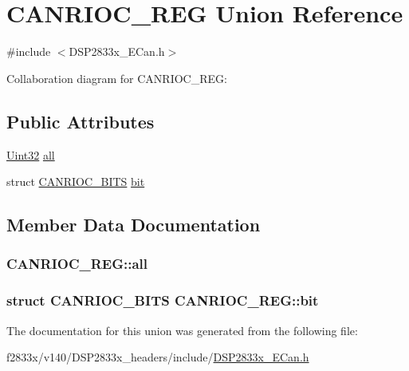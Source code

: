 \hypertarget{union_c_a_n_r_i_o_c___r_e_g}{}\section{C\+A\+N\+R\+I\+O\+C\+\_\+\+R\+E\+G Union Reference}
\label{union_c_a_n_r_i_o_c___r_e_g}


{\ttfamily \#include $<$D\+S\+P2833x\+\_\+\+E\+Can.\+h$>$}



Collaboration diagram for C\+A\+N\+R\+I\+O\+C\+\_\+\+R\+E\+G\+:
\subsection*{Public Attributes}
\begin{DoxyCompactItemize}
\item 
\hyperlink{_d_s_p2833x___device_8h_aba99025e657f892beb7ff31cecf64653}{Uint32} \hyperlink{union_c_a_n_r_i_o_c___r_e_g_ac753aaab9d05739b9a203256e16b3b24}{all}
\item 
struct \hyperlink{struct_c_a_n_r_i_o_c___b_i_t_s}{C\+A\+N\+R\+I\+O\+C\+\_\+\+B\+I\+T\+S} \hyperlink{union_c_a_n_r_i_o_c___r_e_g_a918ebe0c63db3409c4c8c4dceb9e3226}{bit}
\end{DoxyCompactItemize}


\subsection{Member Data Documentation}
\hypertarget{union_c_a_n_r_i_o_c___r_e_g_ac753aaab9d05739b9a203256e16b3b24}{}
\subsubsection[{all}]{ C\+A\+N\+R\+I\+O\+C\+\_\+\+R\+E\+G\+::all}\label{union_c_a_n_r_i_o_c___r_e_g_ac753aaab9d05739b9a203256e16b3b24}
\hypertarget{union_c_a_n_r_i_o_c___r_e_g_a918ebe0c63db3409c4c8c4dceb9e3226}{}
\subsubsection[{bit}]{\setlength{\rightskip}{0pt plus 5cm}struct {\bf C\+A\+N\+R\+I\+O\+C\+\_\+\+B\+I\+T\+S} C\+A\+N\+R\+I\+O\+C\+\_\+\+R\+E\+G\+::bit}\label{union_c_a_n_r_i_o_c___r_e_g_a918ebe0c63db3409c4c8c4dceb9e3226}


The documentation for this union was generated from the following file\+:\begin{DoxyCompactItemize}
\item 
f2833x/v140/\+D\+S\+P2833x\+\_\+headers/include/\hyperlink{_d_s_p2833x___e_can_8h}{D\+S\+P2833x\+\_\+\+E\+Can.\+h}\end{DoxyCompactItemize}
